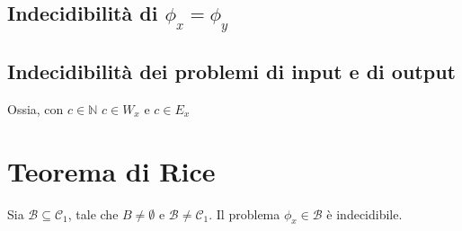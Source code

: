 \subsection{Indecidibilità di $\phi_x = \phi_y$}

\subsection{Indecidibilità dei problemi di input e di output}
Ossia, con $c \in \mathbb{N}$ $c \in W_x$ e $c \in E_x$

\section{Teorema di Rice}

Sia $\mathcal{B} \subseteq \mathcal{C}_1$, tale che $B \neq \emptyset$ e $\mathcal B \neq \mathcal C_1$. Il problema $\phi_x \in \mathcal B$ è indecidibile.
